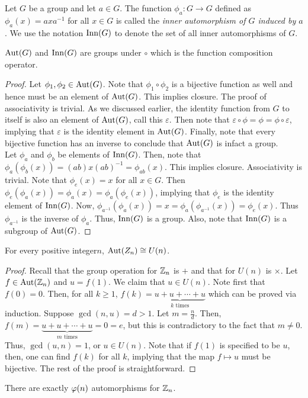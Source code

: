 \begin{definition}
	Let $G$ be a group and let $a\in G$. The function $\phi_a:G\to G$ defined as $\phi_a(x)=axa^{-1}$ for all $x\in G$ is called the \textit{inner automorphism of $G$ induced by $a$}. We use the notation $\operatorname{Inn}(G)$ to denote the set of all inner automorphisms of $G$.
\end{definition}

\begin{proposition}
	$\operatorname{Aut}(G)$ and $\operatorname{Inn}(G)$ are groups under $\circ$ which is the function composition operator.
\end{proposition}
\begin{proof}
	Let $\phi_1,\phi_2\in\operatorname{Aut}(G)$. Note that $\phi_1\circ\phi_2$ is a bijective function as well and hence must be an element of $\operatorname{Aut}(G)$. This implies closure. The proof of associativity is trivial. As we discussed earlier, the identity function from $G$ to itself is also an element of $\operatorname{Aut}(G)$, call this $\varepsilon$. Then note that $\varepsilon\circ\phi=\phi=\phi\circ\varepsilon$, implying that $\varepsilon$ is the identity element in $\operatorname{Aut}(G)$. Finally, note that every bijective function has an inverse to conclude that $\operatorname{Aut}(G)$ is infact a group.\\
	Let $\phi_a$ and $\phi_b$ be elements of $\operatorname{Inn}(G)$. Then, note that $\phi_a(\phi_b(x))=(ab)x(ab)^{-1}=\phi_{ab}(x)$. This implies closure. Associativity is trivial. Note that $\phi_e(x)=x$ for all $x\in G$. Then $\phi_e(\phi_a(x))=\phi_{a}(x)=\phi_a(\phi_e(x))$, implying that $\phi_e$ is the identity element of $\operatorname{Inn}(G)$. Now, $\phi_{a^{-1}}(\phi_a(x))=x=\phi_{a}(\phi_{a^{-1}}(x)) = \phi_e(x)$. Thus $\phi_{a^{-1}}$ is the inverse of $\phi_{a}$. Thus, $\operatorname{Inn}(G)$ is a group. Also, note that $\operatorname{Inn}(G)$ is a subgroup of $\operatorname{Aut}(G)$.
\end{proof}

\begin{proposition}
	For every positive integer$n$, $\operatorname{Aut}(Z_n)\cong U(n)$.
\end{proposition}
\begin{proof}
	Recall that the group operation for $\mathbb{Z}_n$ is $+$ and that for $U(n)$ is $\times$. Let $f\in\operatorname{Aut}(\mathbb{Z}_n)$ and $u=f(1)$. We claim that $u\in U(n)$. Note first that $f(0)=0$. Then, for all $k\ge1$, $f(k)=\underbrace{u+u+\cdots+u}_{k \text{ times}}$ which can be proved via induction. Suppose $\gcd(n,u)=d>1$. Let $m = \frac{n}{d}$. Then, $f(m)=\underbrace{u+u+\cdots+u}_{m \text{ times}}=0=e$, but this is contradictory to the fact that $m\ne0$. Thus, $\gcd(u,n)=1$, or $u\in U(n)$. Note that if $f(1)$ is specified to be $u$, then, one can find $f(k)$ for all $k$, implying that the map $f\mapsto u$ must be bijective. The rest of the proof is straightforward.
\end{proof}

\begin{corollary}
	There are exactly $\varphi(n)$ automorphisms for $\mathbb{Z}_n$.
\end{corollary}
